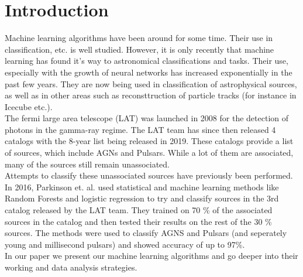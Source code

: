 \section{Introduction}

Machine learning algorithms have been around for some time. Their use in classification, etc. is well studied. However, it is only recently that machine learning has found it's way to astronomical classifications and tasks. Their use, especially with the growth of neural networks has increased exponentially in the past few years. They are now being used in classification of astrophysical sources, as well as in other areas such as reconsttruction of particle tracks (for instance in Icecube etc.). \\
The fermi large area telescope (LAT) was launched in 2008 for the detection of photons in the 	gamma-ray regime. The LAT team has since then released 4 catalogs with the 8-year list being released in 2019. These catalogs provide a list of sources, which include AGNs and Pulsars. While a lot of them are associated, many of the sources still remain unassociated.\\
Attempts to classify these unassociated sources have previously been performed. In 2016, Parkinson et. al. used statistical and machine learning methods like Random Forests and logistic regression to try and classify sources in the 3rd catalog released by the LAT team. They trained on 70 \% of the associated sources in the catalog and then tested their results on the rest of the 30 \% sources. The methods were used to classify AGNS and Pulsars (and seperately young and millisecond pulsars) and showed accuracy of up to 97\%.\\
In our paper we present our machine learning algorithms and go deeper into their working and data analysis strategies.\\



